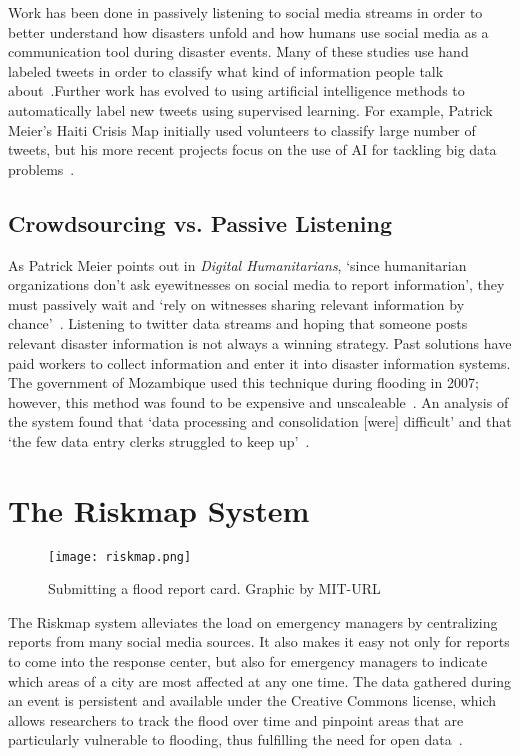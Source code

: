 Work has been done in passively listening to social media streams in order
to better understand how disasters unfold and how humans use social media as a
communication tool during disaster events. Many of these studies use hand
labeled tweets in order to classify what kind of information people talk
about~\cite{alamTwitterTaleThree2018}.Further work has evolved to using
artificial intelligence methods to automatically label new tweets using
supervised learning. For example, Patrick Meier's Haiti Crisis Map initially
used volunteers to classify large number of tweets, but his more recent projects
focus on the use of AI for tackling big data
problems~\cite{meierDigitalHumanitariansHow2015}.

\subsection{Crowdsourcing vs. Passive Listening} 
As Patrick Meier points out in \textit{Digital Humanitarians}, `since
humanitarian organizations don't ask eyewitnesses on social media to report
information', they must passively wait and `rely on witnesses sharing relevant
information by chance'~\cite{meierDigitalHumanitariansHow2015}. Listening to
twitter data streams and hoping that someone posts relevant disaster information
is not always a winning strategy. Past solutions have paid
workers to collect information and enter it into disaster information
systems. The government of Mozambique used this technique during flooding in
2007; however, this method was found to be expensive and
unscaleable~\cite{aminDataNaturalDisasters2008}. An analysis of the system found
that `data processing and consolidation [were] difficult' and that `the few data
entry clerks struggled to keep up'~\cite{aminDataNaturalDisasters2008}.

\section{The Riskmap System}\label{chap1:riskmap}
  \begin{figure}
    \texttt{[image: riskmap.png]}
    \caption{Submitting a flood report card. Graphic by MIT-URL}\label{fig:cards}
  \end{figure}
  The Riskmap system alleviates the load on
  emergency managers by centralizing reports from many social media
  sources. It also makes it easy not only for reports to come into the
  response center, but also for emergency managers to indicate which areas
  of a city are most affected at any one time. The data gathered during an
  event is persistent and available under the Creative Commons license,
  which allows researchers to track the flood over time and pinpoint areas
  that are particularly vulnerable to flooding, thus fulfilling the need
  for open data~\cite{PhilippinesPDCCollaborate,
  antaranews.comBNPBPetaBencanaId}.

